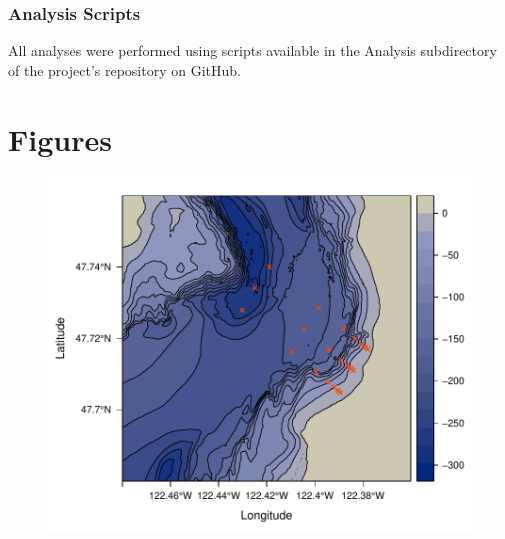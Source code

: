 \documentclass[11pt,letterpaper]{article} %
\begin{document}
\subsubsection*{Analysis Scripts}
\label{analysis_scripts}
All analyses were performed using scripts available in the Analysis subdirectory of the project's repository on GitHub.




\pagebreak
\section*{Figures}

\begin{figure}[H] %
  \centering
    \includegraphics[width=1\textwidth]{site_map.pdf}
    \caption{\protect}
  \label{site_map}
\end{figure}
\end{document}
